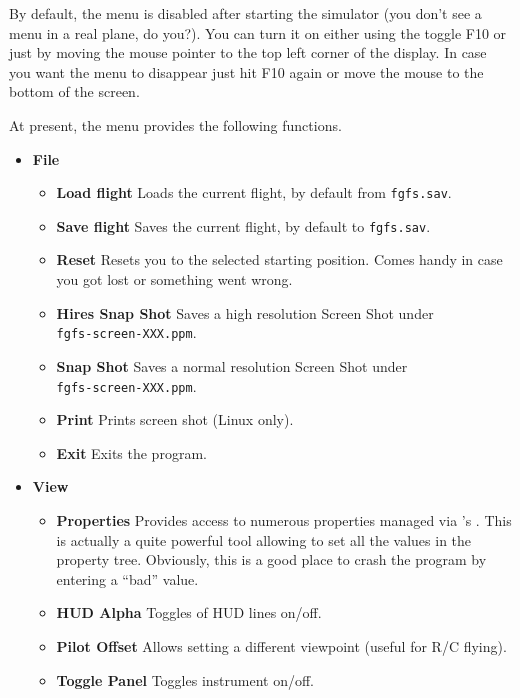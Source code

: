 By default, the menu is disabled after starting the simulator (you
don't see a menu in a real plane, do you?). You can turn it on either
using the toggle F10 or just by moving the mouse pointer to the top
left corner of the display. In case you want the menu to disappear just
hit F10 again or move the mouse to the bottom of the screen.

At present, the menu provides the following functions.

\begin{itemize}
 \item \textbf{File}
 \begin{itemize}
 \item \textbf{Load flight} Loads the current flight, by default from \texttt{fgfs.sav}.
  \item \textbf{Save flight} Saves the current flight, by default to \texttt{fgfs.sav}.
 \item \textbf{Reset} Resets you to the selected starting position. Comes handy in case you got lost or something went wrong.
\item \textbf{Hires Snap Shot} Saves a high resolution Screen Shot under\\ \texttt{fgfs-screen-XXX.ppm}.
  \item \textbf{Snap Shot} Saves a normal resolution Screen Shot under\\ \texttt{fgfs-screen-XXX.ppm}.
  \item \textbf{Print} Prints screen shot (Linux only).
  \item \textbf{Exit} Exits the program.
 \end{itemize}

 \item \textbf{View}
 \begin{itemize}
  \item \textbf{Properties} Provides access to numerous properties managed via \FlightGear{}'s . This is actually a quite powerful tool allowing to set all the values in the property tree. Obviously, this is a good place to crash the program by entering a ``bad'' value.
 \item \textbf{HUD Alpha} Toggles  of HUD lines on/off.
 \item \textbf{Pilot Offset} Allows setting a different viewpoint (useful for R/C flying).
 \item \textbf{Toggle Panel} Toggles instrument  on/off.
 \end{itemize}
 

\end{itemize}
